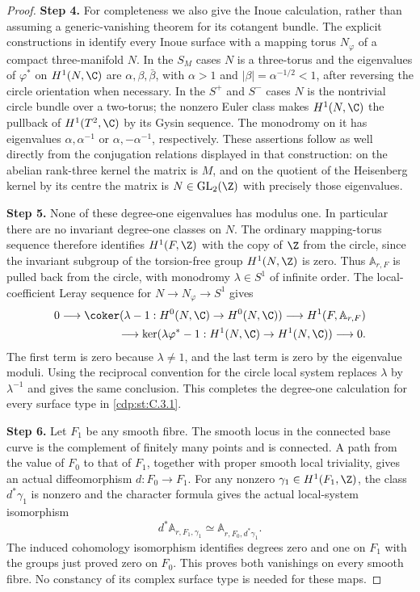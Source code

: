 \begin{proof}
\noindent\textbf{Step 4.} For completeness we also give the Inoue calculation, rather than assuming a generic-vanishing theorem for its cotangent bundle. The explicit constructions in \cite[\S2.1.2 and Proposition~2.3]{Albanese2020} identify every Inoue surface with a mapping torus $N_\varphi$ of a compact three-manifold $N$. In the $S_M$ cases $N$ is a three-torus and the eigenvalues of $\varphi^*$ on $H^1(N,\C)$ are $\alpha,\beta,\bar\beta$, with $\alpha>1$ and $|\beta|=\alpha^{-1/2}<1$, after reversing the circle orientation when necessary. In the $S^+$ and $S^-$ cases $N$ is the nontrivial circle bundle over a two-torus; the nonzero Euler class makes $H^1(N,\C)$ the pullback of $H^1(T^2,\C)$ by its Gysin sequence. The monodromy on it has eigenvalues $\alpha,\alpha^{-1}$ or $\alpha,-\alpha^{-1}$, respectively. These assertions follow as well directly from the conjugation relations displayed in that construction: on the abelian rank-three kernel the matrix is $M$, and on the quotient of the Heisenberg kernel by its centre the matrix is $N\in\mathrm{GL}_2(\Z)$ with precisely those eigenvalues.

\noindent\textbf{Step 5.} None of these degree-one eigenvalues has modulus one. In particular there are no invariant degree-one classes on $N$. The ordinary mapping-torus sequence therefore identifies $H^1(F,\Z)$ with the copy of $\Z$ from the circle, since the invariant subgroup of the torsion-free group $H^1(N,\Z)$ is zero. Thus $\mathbb A_{r,F}$ is pulled back from the circle, with monodromy $\lambda\in S^1$ of infinite order. The local-coefficient Leray sequence for $N\to N_\varphi\to S^1$ gives
\[
\begin{split}
0\longrightarrow
 \coker(\lambda-1:H^0(N,\C)\to H^0(N,\C))
 \longrightarrow H^1(F,\mathbb A_{r,F})\\
 \longrightarrow
 \ker(\lambda\varphi^*-1:H^1(N,\C)\to H^1(N,\C))
 \longrightarrow0.
\end{split}
\]
The first term is zero because $\lambda\ne1$, and the last term is zero by the eigenvalue moduli. Using the reciprocal convention for the circle local system replaces $\lambda$ by $\lambda^{-1}$ and gives the same conclusion. This completes the degree-one calculation for every surface type in \ref{cdp:st:C.3.1}.

\noindent\textbf{Step 6.} Let $F_1$ be any smooth fibre. The smooth locus in the connected base curve is the complement of finitely many points and is connected. A path from the value of $F_0$ to that of $F_1$, together with proper smooth local triviality, gives an actual diffeomorphism $d:F_0\to F_1$. For any nonzero $\gamma_1\in H^1(F_1,\Z)$, the class $d^*\gamma_1$ is nonzero and the character formula gives the actual local-system isomorphism
\[
 d^*\mathbb A_{r,F_1,\gamma_1}
       \simeq\mathbb A_{r,F_0,d^*\gamma_1}.
\]
The induced cohomology isomorphism identifies degrees zero and one on $F_1$ with the groups just proved zero on $F_0$. This proves both vanishings on every smooth fibre. No constancy of its complex surface type is needed for these maps.


\end{proof}
